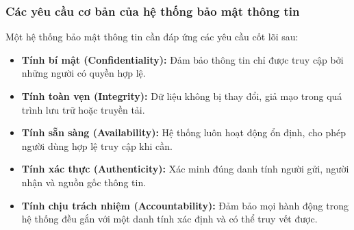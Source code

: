 \subsubsection{Các yêu cầu cơ bản của hệ thống bảo mật thông tin}
\indent Một hệ thống bảo mật thông tin cần đáp ứng các yêu cầu cốt lõi sau:
\begin{itemize}
  \item \textbf{Tính bí mật (Confidentiality):} Đảm bảo thông tin chỉ được truy cập bởi những người có quyền hợp lệ.

  \item \textbf{Tính toàn vẹn (Integrity):} Dữ liệu không bị thay đổi, giả mạo trong quá trình lưu trữ hoặc truyền tải.

  \item \textbf{Tính sẵn sàng (Availability):} Hệ thống luôn hoạt động ổn định, cho phép người dùng hợp lệ truy cập khi cần.

  \item \textbf{Tính xác thực (Authenticity):}  Xác minh đúng danh tính người gửi, người nhận và nguồn gốc thông tin.

  \item \textbf{Tính chịu trách nhiệm (Accountability):} Đảm bảo mọi hành động trong hệ thống đều gắn với một danh tính xác định và có thể truy vết được. 
\end{itemize}